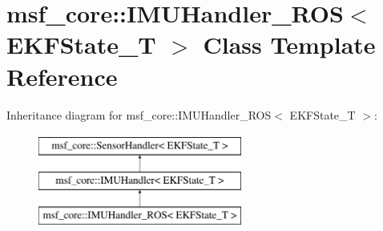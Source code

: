 \hypertarget{classmsf__core_1_1IMUHandler__ROS}{\section{msf\-\_\-core\-:\-:I\-M\-U\-Handler\-\_\-\-R\-O\-S$<$ E\-K\-F\-State\-\_\-\-T $>$ Class Template Reference}
\label{classmsf__core_1_1IMUHandler__ROS}
}
Inheritance diagram for msf\-\_\-core\-:\-:I\-M\-U\-Handler\-\_\-\-R\-O\-S$<$ E\-K\-F\-State\-\_\-\-T $>$\-:\begin{figure}[H]
\begin{center}
\leavevmode
\includegraphics[height=3.000000cm]{classmsf__core_1_1IMUHandler__ROS}
\end{center}
\end{figure}
